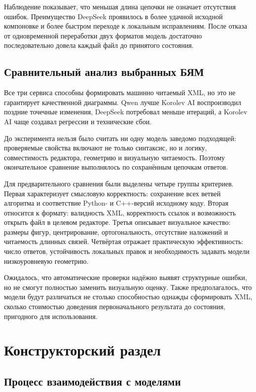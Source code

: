 \documentclass[a4paper,12pt]{extreport}
\begin{document}
Наблюдение показывает, что меньшая длина цепочки не означает отсутствия ошибок. Преимущество DeepSeek проявилось в более удачной исходной компоновке и более быстром переходе к локальным исправлениям. После отказа от одновременной переработки двух форматов модель достаточно последовательно довела каждый файл до принятого состояния.

\section{Сравнительный анализ выбранных БЯМ}

Все три сервиса способны формировать машинно читаемый XML, но это не гарантирует качественной диаграммы. Qwen лучше Korolev AI воспроизводил поздние точечные изменения, DeepSeek потребовал меньше итераций, а Korolev AI чаще создавал регрессии и технические сбои.

До эксперимента нельзя было считать ни одну модель заведомо подходящей: проверяемые свойства включают не только синтаксис, но и логику, совместимость редактора, геометрию и визуальную читаемость. Поэтому окончательное сравнение выполнялось по сохранённым цепочкам ответов.

Для предварительного сравнения были выделены четыре группы критериев. Первая характеризует смысловую корректность: сохранение всех ветвей алгоритма и соответствие Python- и C++-версий исходному коду. Вторая относится к формату: валидность XML, корректность ссылок и возможность открыть файл в целевом редакторе. Третья описывает визуальное качество: размеры фигур, центрирование, ортогональность, отсутствие наложений и читаемость длинных связей. Четвёртая отражает практическую эффективность: число ответов, устойчивость локальных правок и необходимость задавать модели низкоуровневую геометрию.

Ожидалось, что автоматические проверки надёжно выявят структурные ошибки, но не смогут полностью заменить визуальную оценку. Также предполагалось, что модели будут различаться не столько способностью однажды сформировать XML, сколько стоимостью доведения первоначального результата до состояния, пригодного для использования.

\chapter{Конструкторский раздел}

\section{Процесс взаимодействия с моделями}
\end{document}
